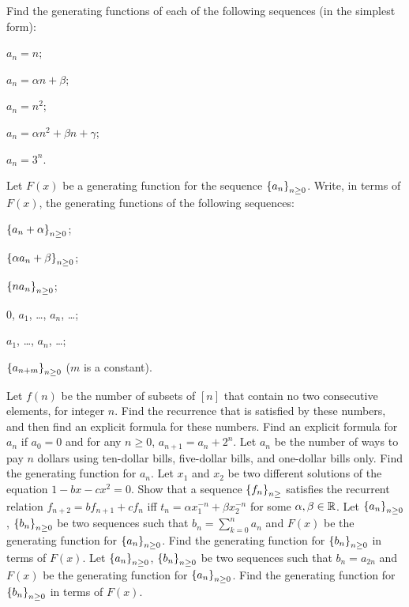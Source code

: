 \begin{chapterendexercises}
  \exercise[recommended] Find the generating functions of each of the following sequences
    (in the simplest form):
    \begin{enumerate}[nolistsep]
      \begin{multicols}{2}
        \item $a_n = n$;
        \item $a_n = \alpha n + \beta$;
        \item $a_n = n^2$;
        \item $a_n = \alpha n^2 + \beta n + \gamma$;
        \item $a_n = 3^n$.
      \end{multicols}
    \end{enumerate}
  \exercise[recommended] Let $F(x)$ be a generating function for the sequence
    $\set{a_n}_{n \ge 0}$. Write, in terms of $F(x)$, the generating functions
    of the following sequences:
    \begin{enumerate}[nolistsep]
      \begin{multicols}{2}
        \item $\set{a_n + \alpha}_{n \ge 0}$;
        \item $\set{\alpha a_n + \beta}_{n \ge 0}$;
        \item $\set{n a_n}_{n \ge 0}$;
        \item $0$, $a_1$, \dots, $a_n$, \dots;
        \item $a_1$, \dots, $a_n$, \dots;
        \item $\set{a_{n + m}}_{n \ge 0}$ ($m$ is a constant).
      \end{multicols}
    \end{enumerate}
  \exercise Let $f(n)$ be the number of subsets of $[n]$ that contain no two
    consecutive elements, for integer $n$. Find the recurrence that is satisfied
    by these numbers, and then find an explicit formula for these numbers.
  \exercise Find an explicit formula for $a_n$ if $a_0 = 0$ and for any
    $n \ge 0$, $a_{n + 1} = a_n + 2^n$.
  \exercise[recommended] Let $a_n$ be the number of ways to pay $n$ dollars using ten-dollar
    bills, five-dollar bills, and one-dollar bills only. Find the generating
    function for $a_n$.
  \exercise[recommended] Let $x_1$ and $x_2$ be two different solutions of the equation
    $1 - bx - cx^2 = 0$. Show that a sequence $\set{f_n}_{n \ge}$ satisfies the
    recurrent relation $f_{n + 2} = b f_{n + 1} + c f_n$ iff
    $t_n = \alpha x_1^{-n} + \beta x_2^{-n}$ for some $\alpha, \beta \in \mathbb{R}$.
  \exercise[recommended] Let $\set{a_n}_{n \ge 0}$, $\set{b_n}_{n \ge 0}$ be two sequences
    such that $b_n = \sum_{k = 0}^n a_n$ and $F(x)$ be the generating function
    for $\set{a_n}_{n \ge 0}$. Find the generating function for
    $\set{b_n}_{n \ge 0}$ in terms of $F(x)$.
  \exercise Let $\set{a_n}_{n \ge 0}$, $\set{b_n}_{n \ge 0}$ be two sequences
    such that $b_n = a_{2n}$ and $F(x)$ be the generating function
    for $\set{a_n}_{n \ge 0}$. Find the generating function for
    $\set{b_n}_{n \ge 0}$ in terms of $F(x)$.
\end{chapterendexercises}
